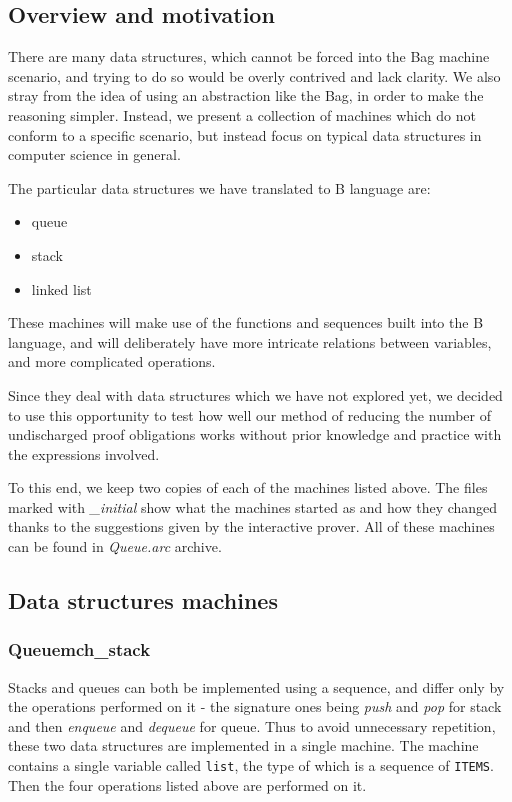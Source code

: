 \documentclass[12pt,journal,duplex]{IEEEtran}
\begin{document}
	\subsection{Overview and motivation}
	There are many data structures, which cannot be forced into the Bag machine scenario, and trying to do so would be overly contrived and lack clarity. We also stray from the idea of using an abstraction like the Bag, in order to make the reasoning simpler. Instead, we present a collection of machines which do not conform to a specific scenario, but instead focus on typical data structures in computer science in general.

	The particular data structures we have translated to B language are:
	\begin{itemize}
		\item queue
		\item stack
		\item linked list
	\end{itemize}

	These machines will make use of the functions and sequences built into the B language, and will deliberately have more intricate relations between variables, and more complicated operations.

	Since they deal with data structures which we have not explored yet, we decided to use this opportunity to test how well our method of reducing the number of undischarged proof obligations works without prior knowledge and practice with the expressions involved.

	To this end, we keep two copies of each of the machines listed above. The files marked with \emph{\_initial} show what the machines started as and how they changed thanks to the suggestions given by the interactive prover. All of these machines can be found in \emph{Queue.arc} archive.

	\subsection{Data structures machines}
	\subsubsection{Queuemch\_stack}

	Stacks and queues can both be implemented using a sequence, and differ only by the operations performed on it - the signature ones being \textit{push} and \textit{pop} for stack and then \textit{enqueue} and \textit{dequeue} for queue. Thus to avoid unnecessary repetition, these two data structures are implemented in a single machine. The machine contains a single variable called \texttt{list}, the type of which is a sequence of \texttt{ITEMS}. Then the four operations listed above are performed on it.
\end{document}
